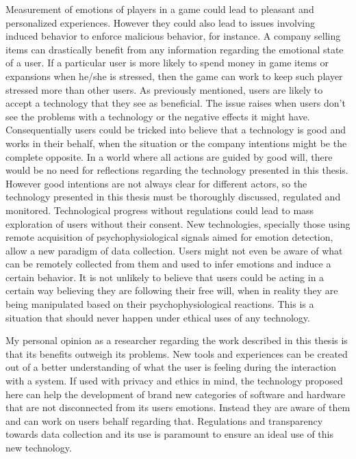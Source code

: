 Measurement of emotions of players in a game could lead to pleasant and personalized experiences. However they could also lead to issues involving induced behavior to enforce malicious behavior, for instance. A company selling items can drastically benefit from any information regarding the emotional state of a user. If a particular user is more likely to spend money in game items or expansions when he/she is stressed, then the game can work to keep such player stressed more than other users. As previously mentioned, users are likely to accept a technology that they see as beneficial. The issue raises when users don't see the problems with a technology or the negative effects it might have. Consequentially users could be tricked into believe that a technology is good and works in their behalf, when the situation or the company intentions might be the complete opposite. In a world where all actions are guided by good will, there would be no need for reflections regarding the technology presented in this thesis. However good intentions are not always clear for different actors, so the technology presented in this thesis must be thoroughly discussed, regulated and monitored. Technological progress without regulations could lead to mass exploration of users without their consent. New technologies, specially those using remote acquisition of psychophysiological signals aimed for emotion detection, allow a new paradigm of data collection. Users might not even be aware of what can be remotely collected from them and used to infer emotions and induce a certain behavior. It is not unlikely to believe that users could be acting in a certain way believing they are following their free will, when in reality they are being manipulated based on their psychophysiological reactions. This is a situation that should never happen under ethical uses of any technology.

My personal opinion as a researcher regarding the work described in this thesis is that its benefits outweigh its problems. New tools and experiences can be created out of a better understanding of what the user is feeling during the interaction with a system. If used with privacy and ethics in mind, the technology proposed here can help the development of brand new categories of software and hardware that are not disconnected from its users emotions. Instead they are aware of them and can work on users behalf regarding that. Regulations and transparency towards data collection and its use is paramount to ensure an ideal use of this new technology.
